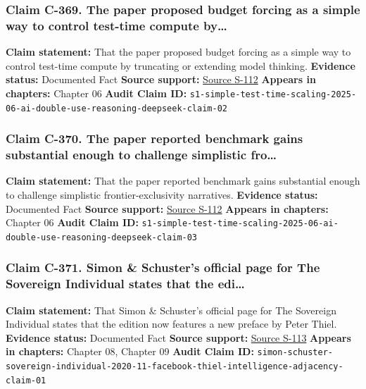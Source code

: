\documentclass[
  american,
  11pt,
  letterpaper,
]{article}
\begin{document}
\subsubsection{Claim C-369. The paper proposed budget forcing as a
simple way to control test-time compute
by\ldots{}}\label{claim-c-369-the-paper-proposed-budget-forcing-as-a-simple-way-to-control-test-time-compute-by}

\textbf{Claim statement:} That the paper proposed budget forcing as a
simple way to control test-time compute by truncating or extending model
thinking. \textbf{Evidence status:} Documented Fact \textbf{Source
support:} \hyperref[source-s-112-s1-simple-test-time-scaling]{Source
S-112} \textbf{Appears in chapters:} Chapter 06 \textbf{Audit Claim ID:}
\texttt{s1-simple-test-time-scaling-2025-06-ai-double-use-reasoning-deepseek-claim-02}

\subsubsection{Claim C-370. The paper reported benchmark gains
substantial enough to challenge simplistic
fro\ldots{}}\label{claim-c-370-the-paper-reported-benchmark-gains-substantial-enough-to-challenge-simplistic-fro}

\textbf{Claim statement:} That the paper reported benchmark gains
substantial enough to challenge simplistic frontier-exclusivity
narratives. \textbf{Evidence status:} Documented Fact \textbf{Source
support:} \hyperref[source-s-112-s1-simple-test-time-scaling]{Source
S-112} \textbf{Appears in chapters:} Chapter 06 \textbf{Audit Claim ID:}
\texttt{s1-simple-test-time-scaling-2025-06-ai-double-use-reasoning-deepseek-claim-03}

\subsubsection{Claim C-371. Simon \& Schuster's official page for The
Sovereign Individual states that the
edi\ldots{}}\label{claim-c-371-simon-schuster-s-official-page-for-the-sovereign-individual-states-that-the-edi}

\textbf{Claim statement:} That Simon \& Schuster's official page for The
Sovereign Individual states that the edition now features a new preface
by Peter Thiel. \textbf{Evidence status:} Documented Fact \textbf{Source
support:}
\hyperref[source-s-113-the-sovereign-individual-official-publisher-page]{Source
S-113} \textbf{Appears in chapters:} Chapter 08, Chapter 09
\textbf{Audit Claim ID:}
\texttt{simon-schuster-sovereign-individual-2020-11-facebook-thiel-intelligence-adjacency-claim-01}
\end{document}
